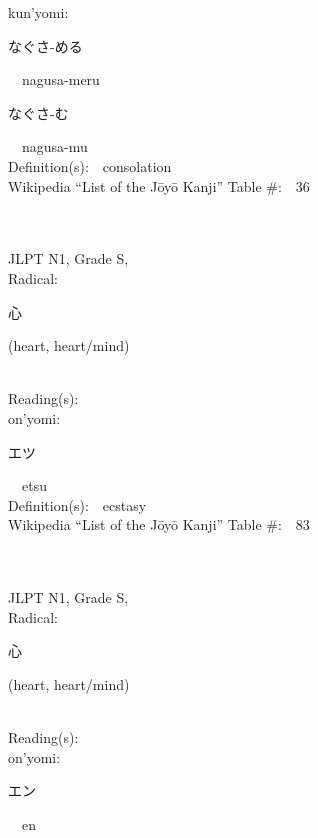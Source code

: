 \begin{multicols}{2}
{\hspace*{1em}}kun'yomi:\ \ \\
{\hspace*{2em}}{\begin{CJK}{UTF8}{min} なぐさ-める \end{CJK}}\ \ nagusa-meru\ \ \\
{\hspace*{2em}}{\begin{CJK}{UTF8}{min} なぐさ-む \end{CJK}}\ \ nagusa-mu\ \ \\
Definition(s):\ \ consolation \\
Wikipedia ``List of the J\=oy\=o Kanji'' Table \#:\ \ 36 \\
\ \ \\
{\fontsize{34pt}{40pt}  }\ \ \\
{JLPT N1, Grade S, \\Radical:\ \ {\begin{CJK}{UTF8}{min} 心 \end{CJK}} (heart, heart/mind) } \\
Reading(s):\ \ \\
{\hspace*{1em}}on'yomi:\ \ \\
{\hspace*{2em}}{\begin{CJK}{UTF8}{min} エツ \end{CJK}}\ \ etsu\ \ \\
Definition(s):\ \ ecstasy \\
Wikipedia ``List of the J\=oy\=o Kanji'' Table \#:\ \ 83 \\
\ \ \\
{\fontsize{34pt}{40pt}  }\ \ \\
{JLPT N1, Grade S, \\Radical:\ \ {\begin{CJK}{UTF8}{min} 心 \end{CJK}} (heart, heart/mind) } \\
Reading(s):\ \ \\
{\hspace*{1em}}on'yomi:\ \ \\
{\hspace*{2em}}{\begin{CJK}{UTF8}{min} エン \end{CJK}}\ \ en\ \ \\

\end{multicols}
